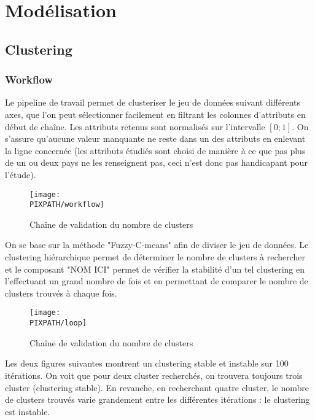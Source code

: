 \section{Modélisation}

\subsection{Clustering}

\subsubsection{Workflow}

Le pipeline de travail permet de clusteriser le jeu de données suivant
différents axes, que l'on peut sélectionner facilement en filtrant les
colonnes d'attributs en début de chaîne. Les attributs retenus sont
normalisés sur l'intervalle $[ 0 ; 1 ]$. On s'assure qu'aucune valeur
manquante ne reste dans un des attributs en enlevant la ligne concernée
(les attributs étudiés sont choisi de manière à ce que pas plus de un ou
deux pays ne les renseignent pas, ceci n'est donc pas handicapant pour
l'étude).\\

\begin{figure}[h]
\centering
\caption{Chaîne de validation du nombre de clusters}
\texttt{[image: \\PIXPATH/workflow]}
\end{figure}

On se base sur la méthode "Fuzzy-C-means" afin de diviser le jeu de
données. Le clustering hiérarchique permet de déterminer le nombre de
clusters à rechercher et le composant "NOM ICI" permet de vérifier la stabilité
d'un tel clustering en l'effectuant un grand nombre de fois et en
permettant de comparer le nombre de clusters trouvés à chaque fois.\\

\begin{figure}[h]
\centering
\caption{Chaîne de validation du nombre de clusters}
\texttt{[image: \\PIXPATH/loop]}
\end{figure}

Les deux figures suivantes montrent un clustering stable et instable sur
100 itérations. On voit que pour deux cluster recherchés, on trouvera
toujours trois cluster (clustering stable). En revanche, en recherchant
quatre cluster, le nombre de clusters trouvés varie grandement entre les
différentes itérations : le clustering est instable.

